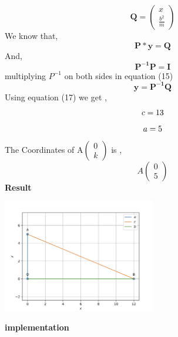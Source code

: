 \documentclass[10pt,a4paper]{report}
\begin{document}
\begin{multicols}{2}
\begin{equation}
 \boldsymbol{Q} = \begin{pmatrix}
x\\
\frac{b^2}{m}
\end{pmatrix} 
\end{equation}\vspace{2mm}
We know that,\\
\begin{equation}
\boldsymbol{P * y = Q}
\end{equation}
And,\\
\begin{equation}
\boldsymbol{P^{-1} P = I}
\end{equation}
multiplying $P^{-1}$ on both sides in equation (15)\\
\begin{equation}
 \boldsymbol{y = P^{-1} Q}
\end{equation}
Using equation (17) we get ,
\begin{equation}
c = 13 \vspace{2mm}
\end{equation}
\begin{equation}
 a = 5 \vspace{2mm}
\end{equation}
The Coordinates of A$\begin{pmatrix}
0\\
k
\end{pmatrix}$  is ,
\begin{equation}
  A\begin{pmatrix}
0 \\
5
\end{pmatrix} 
\end{equation}
\textbf{Result} 
\begin{center}
 \includegraphics[width=0.5\textwidth]{matrix.jpg}  
 \end{center}\vspace{5mm}
 \vspace{2mm}  
\textbf{implementation}
\begin{center}

\end{center}
\end{multicols}
\end{document}
